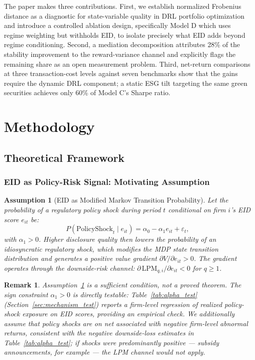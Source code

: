 \documentclass[12pt]{article}
\newtheorem{assumption}{Assumption}
\newtheorem{remark}{Remark}
\begin{document}
The paper makes three contributions. First, we establish normalized Frobenius distance as a diagnostic for state-variable quality in DRL portfolio optimization and introduce a controlled ablation design, specifically Model D which uses regime weighting but withholds EID, to isolate precisely what EID adds beyond regime conditioning. Second, a mediation decomposition attributes 28\% of the stability improvement to the reward-variance channel and explicitly flags the remaining share as an open measurement problem. Third, net-return comparisons at three transaction-cost levels against seven benchmarks show that the gains require the dynamic DRL component; a static ESG tilt targeting the same green securities achieves only 60\% of Model C's Sharpe ratio.

\section{Methodology}
\label{sec:methodology}

\subsection{Theoretical Framework}

\subsubsection{EID as Policy-Risk Signal: Motivating Assumption}

\begin{assumption}[EID as Modified Markov Transition Probability]
\label{ass:eid_mdp}
Let the probability of a regulatory policy shock during period $t$
conditional on firm $i$'s EID score $e_{it}$ be:
\begin{equation}
  P(\mathrm{PolicyShock}_t\mid e_{it})=\alpha_0-\alpha_1 e_{it}+\varepsilon_t,
  \label{eq:policy_shock}
\end{equation}
with $\alpha_1>0$. Higher disclosure quality then lowers the
probability of an idiosyncratic regulatory shock, which modifies the
MDP state transition distribution and generates a positive value
gradient $\partial V/\partial e_{it}>0$. The gradient operates through
the downside-risk channel: $\partial\,\mathrm{LPM}_{q,i}/\partial
e_{it}<0$ for $q\geq 1$.
\end{assumption}

\begin{remark}
Assumption~\ref{ass:eid_mdp} is a \emph{sufficient condition}, not a
proved theorem. The sign constraint $\alpha_1>0$ is directly testable:
Table~\ref{tab:alpha_test} (Section~\ref{sec:mechanism_test}) reports
a firm-level regression of realized policy-shock exposure on EID scores,
providing an empirical check. We additionally assume that policy shocks
are on net associated with \emph{negative} firm-level abnormal returns,
consistent with the negative downside-loss estimates in
Table~\ref{tab:alpha_test}; if shocks were predominantly positive --- subsidy announcements, for
example --- the LPM channel would not apply.
\end{remark}
\end{document}
